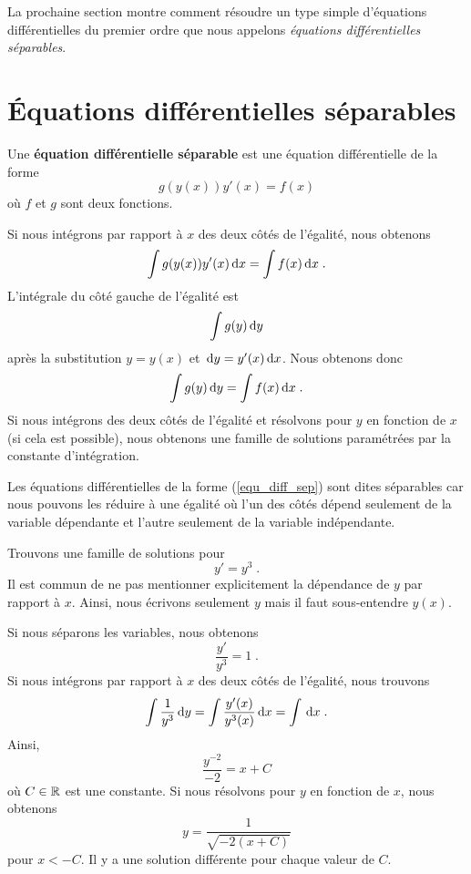 {La prochaine section montre comment résoudre un type simple
d'équations différentielles du premier ordre que nous appelons
{\em équations différentielles séparables}.

\section{Équations différentielles séparables}

\begin{focus}{\dfn} 
Une {\bfseries équation différentielle séparable} est une équation
différentielle de la forme
\begin{equation}\label{equ_diff_sep}
g(y(x)) y'(x) = f(x)
\end{equation}
où $f$ et $g$ sont deux fonctions.
\end{focus}

Si nous intégrons par rapport à $x$ des deux côtés de l'égalité, nous
obtenons
\[
\int g(y(x)) y'(x) \,\mathrm{d}x = \int f(x) \,\mathrm{d}x \; .
\]
L'intégrale du côté gauche de l'égalité est
\[
\int g(y) \,\mathrm{d}y
\]
après la substitution $y = y(x)$ et $\,\mathrm{d}y = y'(x) \,\mathrm{d}x$.  Nous
obtenons donc
\[
\int g(y) \,\mathrm{d}y = \int f(x) \,\mathrm{d}x \; .
\]
Si nous intégrons des deux côtés de l'égalité et résolvons pour $y$ en
fonction de $x$ (si cela est possible), nous obtenons une famille de
solutions paramétrées par la constante d'intégration.

Les équations différentielles de la forme (\ref{equ_diff_sep}) sont
dites séparables car nous pouvons les réduire à une égalité où l'un des
côtés dépend seulement de la variable dépendante et l'autre seulement
de la variable indépendante.

\begin{egg}
Trouvons une famille de solutions pour
\[
y' = y^3 \; .
\]
Il est commun de ne pas mentionner explicitement la dépendance de $y$
par rapport à $x$.  Ainsi, nous écrivons seulement $y$ mais il faut
sous-entendre $y(x)$.

Si nous séparons les variables, nous obtenons
\[
\frac{y'}{y^3} = 1 \; .
\]
Si nous intégrons par rapport à $x$ des deux côtés de l'égalité, nous trouvons
\[
\int \frac{1}{y^3} \,\mathrm{d}y = \int \frac{y'(x)}{y^3(x)} \,\mathrm{d}x = \int \,\mathrm{d}x \; .
\]
Ainsi,
\[
\frac{y^{-2}}{-2} = x + C
\]
où $C \in \mathbb{R}$ est une constante.  Si nous résolvons pour $y$ en fonction
de $x$, nous obtenons
\[
y = \frac{1}{\sqrt{-2(x+C)}}
\]
pour $x < -C$.  Il y a une solution différente pour chaque valeur de $C$.
\end{egg}

}
